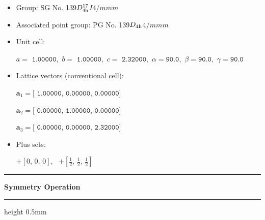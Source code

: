 \documentclass[fleqn,10pt,landscape]{jsarticle}
\begin{document}
\begin{itemize}
\item Group: SG No. 139\quad$D_{\rm 4h}^{17}$\quad$I4/mmm$\quad[ tetragonal ]
\item Associated point group: PG No. 139\quad$D_{\rm 4h}$\quad$4/mmm$\quad[ tetragonal ]
\end{itemize}
\begin{itemize}
\item Unit cell:

\quad $a=\texttt{ 1.00000},\,\, b=\texttt{ 1.00000},\,\, c=\texttt{ 2.32000},\,\, \alpha=\texttt{90.0},\,\, \beta=\texttt{90.0},\,\, \gamma=\texttt{90.0}$

\item Lattice vectors (conventional cell):

\quad $\bm{a}_1=\texttt{[ 1.00000, 0.00000, 0.00000]}$

\quad $\bm{a}_2=\texttt{[ 0.00000, 1.00000, 0.00000]}$

\quad $\bm{a}_3=\texttt{[ 0.00000, 0.00000, 2.32000]}$

\item Plus sets:

\quad $+\left[ 0,\, 0,\, 0 \right]$,\,\,\, $+\left[ \frac{1}{2},\, \frac{1}{2},\, \frac{1}{2} \right]$

\end{itemize}
\vspace{5mm}
\noindent \rule[0.5mm]{5mm}{0.5mm}\hspace{3mm}\textbf{Symmetry Operation}\hspace{3mm}\leaders\hrule height 0.5mm\hfill\kern0pt
\vspace{3mm}
\end{document}
